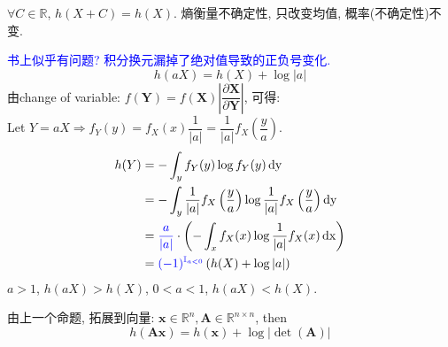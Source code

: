 \begin{proposition}
$\forall C\in \mathbb{R}$, $h(X+C)=h(X)$. 熵衡量不确定性, 只改变均值, 概率(不确定性)不变.
\end{proposition}

\begin{proposition} \textcolor{blue}{书上似乎有问题? 积分换元漏掉了绝对值导致的正负号变化.}
$$h(aX) = h(X)+\log |a|$$
由change of variable: $f(\mathbf{Y})=f(\mathbf{X})\left|\dfrac{\partial \mathbf{X}}{\partial \mathbf{Y}}\right|$, 可得: \\
Let $Y=aX\Rightarrow f_Y(y)=f_X(x)\dfrac{1}{|a|}=\dfrac{1}{|a|}f_X\left(\dfrac{y}{a}\right)$.
\begin{align*}
h(Y) &= -\int_y f_Y(y)\log f_Y(y) \operatorname{dy} \\
&= -\int_y \dfrac{1}{|a|}f_X\left(\dfrac{y}{a}\right)\log \dfrac{1}{|a|}f_X\left(\dfrac{y}{a}\right) \operatorname{dy} \\
&= \textcolor{blue}{\dfrac{a}{|a|}}\cdot \left(-\int_x f_X(x)\log \dfrac{1}{|a|}f_X(x) \operatorname{dx} \right) \\
&= \textcolor{blue}{(-1)^{\mathbb{I}_{a<0}}}\left(h(X)+\log |a| \right)
\end{align*}
$a>1$, $h(aX)>h(X)$, $0<a<1$, $h(aX)<h(X)$.
\end{proposition}

\begin{proposition}
由上一个命题, 拓展到向量: $\mathbf{x}\in\mathbb{R}^n, \mathbf{A}\in\mathbb{R}^{n\times n}$, then
$$h(\mathbf{Ax})=h(\mathbf{x})+\log |\det (\mathbf{A})|$$
\end{proposition}

